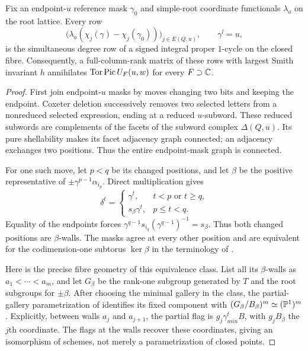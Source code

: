 \begin{proposition}\label{tor:mask-degrees}
Fix an endpoint-$u$ reference mask $\gamma_0$ and simple-root coordinate functionals $\lambda_a$ on the root lattice. Every row
\begin{equation}\label{tor:raw-rows}
 \bigl(\lambda_a(\chi_j(\gamma)-\chi_j(\gamma_0))\bigr)_{j\in E(Q,u)},
 \qquad \gamma^l=u,
\end{equation}
is the simultaneous degree row of a signed integral proper $1$-cycle on the closed fibre. Consequently, a full-column-rank matrix of these rows with largest Smith invariant $h$ annihilates $\operatorname{Tor}\operatorname{Pic} U_F(u,w)$ for every $F\supset\mathbb C$.
\end{proposition}
\begin{proof}
First join endpoint-$u$ masks by moves changing two bits and keeping the endpoint. Coxeter deletion successively removes two selected letters from a nonreduced selected expression, ending at a reduced $u$-subword. These reduced subwords are complements of the facets of the subword complex $\Delta(Q,u)$. Its pure shellability \cite[Theorems~2.5 and 3.7]{KM04} makes its facet adjacency graph connected; an adjacency exchanges two positions. Thus the entire endpoint-mask graph is connected.

For one such move, let $p<q$ be its changed positions, and let $\beta$ be the positive representative of $\pm\gamma^{p-1}\alpha_{i_p}$. Direct multiplication gives
\[
 \delta^t=
 \begin{cases}
  \gamma^t,&t<p\text{ or }t\ge q,\\
  s_\beta\gamma^t,&p\le t<q.
 \end{cases}
\]
Equality of the endpoints forces $\gamma^{q-1}s_{i_q}(\gamma^{q-1})^{-1}=s_\beta$. Thus both changed positions are $\beta$-walls. The masks agree at every other position and are equivalent for the codimension-one subtorus $\ker\beta$ in the terminology of \cite[Sections~1 and 4]{Ha04}.

Here is the precise fibre geometry of this equivalence class. List all its $\beta$-walls as $a_1<\cdots<a_m$, and let $G_\beta$ be the rank-one subgroup generated by $T$ and the root subgroups for $\pm\beta$. After choosing the minimal gallery in the class, the partial-gallery parametrization of \cite[equation~(4.1), Proposition~4.2 and Corollary~4.4]{Ha04} identifies its fixed component with $(G_\beta/B_\beta)^m\simeq(\mathbb P^1)^m$. Explicitly, between walls $a_j$ and $a_{j+1}$, the partial flag is $g_j\gamma_{min}^tB$, with $g_jB_\beta$ the $j$th coordinate. The flags at the walls recover these coordinates, giving an isomorphism of schemes, not merely a parametrization of closed points.


\end{proof}
